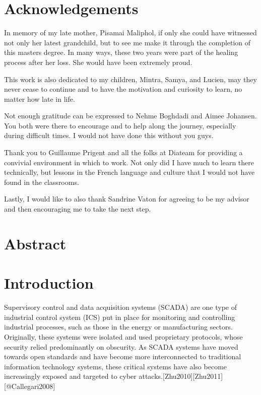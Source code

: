 \documentclass[12pt,]{article}
\begin{document}
\thispagestyle{empty} \newpage

\section*{Acknowledgements}\label{acknowledgements}

In memory of my late mother, Pisamai Maliphol, if only she could have
witnessed not only her latest grandchild, but to see me make it through
the completion of this masters degree. In many ways, these two years
were part of the healing process after her loss. She would have been
extremely proud.

This work is also dedicated to my children, Mintra, Samya, and Lucien,
may they never cease to continue and to have the motivation and
curiosity to learn, no matter how late in life.

Not enough gratitude can be expressed to Nehme Boghdadi and Aimee
Johansen. You both were there to encourage and to help along the
journey, especially during difficult times. I would not have done this
without you guys.

Thank you to Guillaume Prigent and all the folks at Diateam for
providing a convivial environment in which to work. Not only did I have
much to learn there technically, but lessons in the French language and
culture that I would not have found in the classrooms.

Lastly, I would like to also thank Sandrine Vaton for agreeing to be my
advisor and then encouraging me to take the next step.

\pagebreak

\section*{Abstract}\label{abstract}

\pagebreak

\section{Introduction}\label{introduction}

Supervisory control and data acquisition systems (SCADA) are one type of
industrial control system (ICS) put in place for monitoring and
controlling industrial processes, such as those in the energy or
manufacturing sectors. Originally, these systems were isolated and used
proprietary protocols, whose security relied predominantly on obscurity.
As SCADA systems have moved towards open standards and have become more
interconnected to traditional information technology systems, these
critical systems have also become increasingly exposed and targeted to
cyber attacks.{[}Zhu2010{]}{[}Zhu2011{]}{[}@Callegari2008{]}
\end{document}
